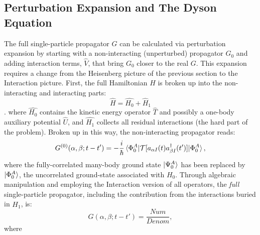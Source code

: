\subsection{Perturbation Expansion and The Dyson Equation}
The full single-particle propagator $G$ can be calculated via perturbation
expansion by starting with a non-interacting (unperturbed) propagator $G_{0}$
and adding interaction 
terms, $\hat{V}$, that bring $G_{0}$ closer to the real $G$. This expansion requires a change from
the Heisenberg picture of the previous section to the Interaction
picture\footnotemark. First, the full Hamiltonian $H$ is broken up into the non-interacting and interacting
parts:
\begin{equation}
    \hat{H} = \hat{H_{0}}+\hat{H}_{1}
\end{equation}
. 
where $\hat{H_{0}}$ contains the kinetic energy operator $\hat{T}$
and possibly a one-body auxiliary
potential $\hat{U}$, and $\hat{H_{1}}$ collects all residual interactions (the hard part of the
problem). Broken up in this way, the non-interacting propagator reads:
\begin{equation}
    G^{(0)}(\alpha, \beta; t-t') =
    -\frac{i}{\hbar}\braket{\Phi^{A}_{0}|
    \mathcal{T}[a_{\alpha I}(t)a^{\dagger}_{\beta I}(t')]|\Phi^{A}_{0}},
\end{equation}
where the fully-correlated many-body ground state $\ket{\Psi^{A}_{0}}$ has been replaced by
$\ket{\Phi^{A}_{0}}$, the uncorrelated ground-state associated with $H_{0}$. Through algebraic
manipulation and employing the Interaction version of all operators,
the \textit{full} single-particle propagator, including the
contribution from the interactions buried in $\hat{H_{1}}$, is:
\begin{equation} \label{FullSPPropagator}
    G(\alpha, \beta; t-t') = \frac{Num}{Denom},
\end{equation}
where
